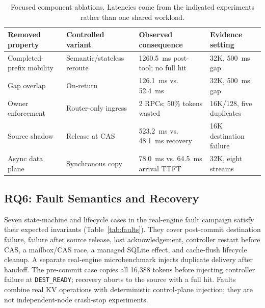 \begin{table}[t]
\centering
\small
\caption{Focused component ablations. Latencies come from the indicated experiments rather than one shared workload.}
\label{tab:ablations}
\begin{tabular}{llll}
\toprule
Removed property & Controlled variant & Observed consequence & Evidence setting \\
\midrule
Completed-prefix mobility & Semantic/stateless reroute & 1260.5~ms post-tool; no full hit & 32K, 500~ms gap \\
Gap overlap & On-return & 126.1~ms vs. 52.4~ms & 32K, 500~ms gap \\
Owner enforcement & Router-only ingress & 2 RPCs; 50\% tokens wasted & 16K/128, five duplicates \\
Source shadow & Release at CAS & 523.2~ms vs. 48.1~ms recovery & 16K destination failure \\
Async data plane & Synchronous copy & 78.0~ms vs. 64.5~ms arrival TTFT & 32K, eight streams \\
\bottomrule
\end{tabular}
\end{table}

\subsection{RQ6: Fault Semantics and Recovery}\label{rq6-fault-semantics-and-recovery}

Seven state-machine and lifecycle cases in the real-engine fault campaign satisfy their expected invariants (Table~\ref{tab:faults}). They cover post-commit destination failure, failure after source release, lost acknowledgement, controller restart before CAS, a mailbox/CAS race, a managed SQLite effect, and cache-flush lifecycle cleanup. A separate real-engine microbenchmark injects duplicate delivery after handoff. The pre-commit case copies all 16,388 tokens before injecting controller failure at \texttt{DEST\_READY}; recovery aborts to the source with a full hit. Faults combine real KV operations with deterministic control-plane injection; they are not independent-node crash-stop experiments.

